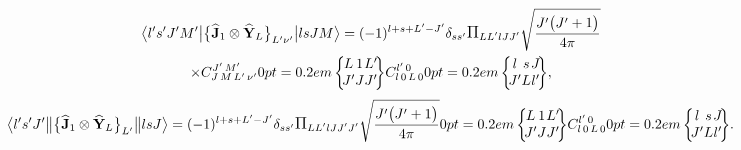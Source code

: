 \begin{multline}
\braOket{ l^{\prime} s^{\prime} J^{\prime} M^{\prime}}{\bigl\{\widehat{\vect{J}}_{1} \otimes \widehat{\vect{Y}}_{L}\bigr\}_{L^{\prime} \nu^{\prime}}}{l s J M}=(-1)^{l+s+L^{\prime}-J^{\prime}} \delta_{s s^{\prime}} \Fact{L L^\prime l J J^\prime}\sqrt{\frac{ J^{\prime}\bigl(J^{\prime}+1\bigr)}{4 \pi}} \\
\times
\clebsch{J}{M}{L^{\prime}}{\nu^{\prime}}{J^{\prime}}{M^{\prime}}
\sixj{L}{1}{L^{\prime}}{J^{\prime}}{J}{J^{\prime}}
\clebsch{l}{0}{L}{0}{l^{\prime}}{0}
\sixj{l}{s}{J}{J^{\prime}}{L}{l^{\prime}}, \label{eq:13:2:125}
\end{multline}
\begin{equation*}
\braOketred{ l^{\prime} s^{\prime} J^{\prime}}{\bigl\{\widehat{\vect{J}}_{1} \otimes \widehat{\vect{Y}}_{L}\bigr\}_{L^{\prime}}}{l s J}=(-1)^{l+s+L^{\prime}-J^{\prime}} \delta_{s s^{\prime}} \Fact{L L^\prime l J J^\prime J^{\prime}}\sqrt{\frac{ J^{\prime}\bigl(J^{\prime}+1\bigr)}{4 \pi}}
\sixj{L}{1}{L^{\prime}}{J^{\prime}}{J}{J^{\prime}}
\clebsch{l}{0}{L}{0}{l^{\prime}}{0}
\sixj{l}{s}{J}{J^{\prime}}{L}{l^{\prime}}.
\end{equation*}

